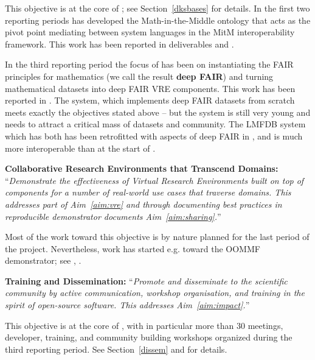 \begin{compactenum}[\bf {Obj} 1\rm]
  This objective is at the core of ; see Section~\ref{dksbases} for details.
  In the first two reporting periods  has developed the Math-in-the-Middle ontology that acts as the pivot point mediating between system languages in the MitM interoperability framework.
  This work has been reported in deliverables  and .

  In the third reporting period the focus of  has been on instantiating the FAIR principles for mathematics (we call the result \textbf{deep FAIR}) and turning mathematical datasets into deep FAIR VRE components.
  This work has been reported in .
  The \dmh system, which implements deep FAIR datasets from scratch meets exactly the objectives stated above -- but the system is still very young and needs to attract a critical mass of datasets and community.
  The LMFDB system which has both has been retrofitted with aspects of deep FAIR in \pn, and is much more interoperable than at the start of \pn. 

\item \label{objective:demo}
  \textbf{Collaborative Research Environments that Transcend Domains:}
  ``\emph{Demonstrate the effectiveness of Virtual
    Research Environments built on top of \ODK components for a
    number of real-world use cases that traverse domains. This addresses
    part of Aim~\ref{aim:vre} and through documenting best practices in
    reproducible demonstrator documents Aim~\ref{aim:sharing}.}''


  Most of the work toward this objective is by nature planned for the last period of the \pn
  project. Nevertheless, work has started e.g.  toward the OOMMF demonstrator; see
  ,
  .

\item \label{objective:disseminate}
  \textbf{Training and Dissemination:}
  ``\emph{Promote and disseminate
    \ODK to the scientific community by active communication,
    workshop organisation, and training in the spirit of open-source
    software. This addresses Aim~\ref{aim:impact}.}''

  This objective is at the core of , with in particular
  more than 30 meetings, developer, training, and community building
  workshops organized during the third reporting period. See
  Section~\ref{dissem} and  for
  details.
\end{compactenum}

